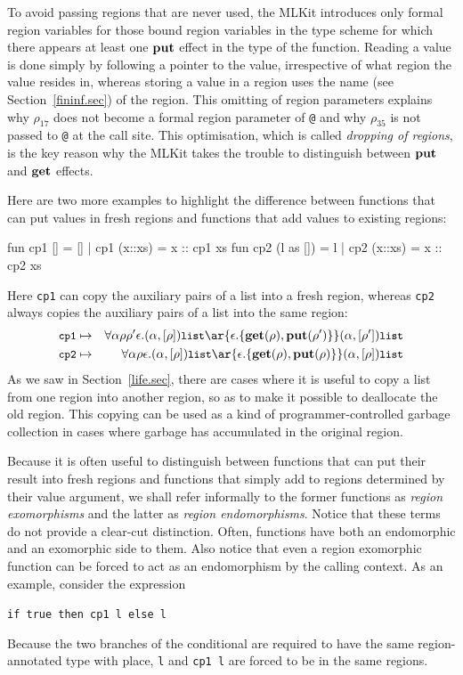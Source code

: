 \documentclass[12pt]{book}
\begin{document}
To avoid passing regions that are never used, the MLKit introduces only formal
region variables for those bound region variables in the type scheme for which
there appears at least one
%
%
$\mathop{\bf put}\nolimits$ effect in the type of the function.  Reading a value is done simply by
following a pointer to the value, irrespective of what region the value resides
in, whereas storing a value in a region uses the name (see
Section~\ref{fininf.sec}) of the region.  This omitting of region parameters
explains why $\rho_{17}$ does not become a formal region parameter of
\lstinline{@} and why $\rho_{35}$ is not passed to \lstinline{@} at the call
site. This optimisation, which is called
%
%
{\em dropping of regions}, is the key reason why the MLKit takes the trouble to
distinguish between $\mathop{\bf put}\nolimits$ and
%
%
$\mathop{\bf get}\nolimits$ \label{bother-to-distinguish-get-n-put}effects.

Here are two more examples to highlight the difference between functions that
can put values in fresh regions and functions that add values to existing
regions:
\begin{smlcode}
  fun cp1 [] = []
    | cp1 (x::xs) = x :: cp1 xs
  fun cp2 (l as []) = l
    | cp2 (x::xs) = x :: cp2 xs
\end{smlcode}
Here \lstinline{cp1} can copy the auxiliary pairs of a list into a fresh
region, whereas \lstinline{cp2} always copies the auxiliary pairs of a
list into the same region:
\begin{eqnarray*}
\kw{cp1}&\mapsto&\forall\alpha\rho\rho'\epsilon.
     (\alpha,[\rho])\kw{list} \ar{\epsilon.\{\Get(\rho),
           \Put(\rho')\}} (\alpha,[\rho'])\kw{list}\\
\kw{cp2}&\mapsto&\forall\alpha\rho\epsilon.
     (\alpha,[\rho])\kw{list} \ar{\epsilon.\{\Get(\rho),
           \Put(\rho)\}} (\alpha,[\rho])\kw{list}
\end{eqnarray*}
As we saw in Section~\ref{life.sec}, there are cases where it is useful to copy
a list from one region into another region, so as to make it possible to
deallocate the old region. This copying can be used as a kind of
programmer-controlled garbage collection in cases where garbage has accumulated
in the original region.

Because it is often useful to distinguish between functions that can put their
result into fresh regions and functions that simply add to regions determined by
their value argument, we shall refer informally to the former functions as
%
%
{\em region exomorphisms} and the latter as
%
%
{\em region endomorphisms}. Notice that these terms do not provide a clear-cut
distinction. Often, functions have both an endomorphic and an exomorphic side to
them. Also notice that even a region exomorphic function can be forced to act as
an endomorphism by the calling context. As an example, consider the expression
\begin{center}
  \lstinline!if true then cp1 l else l!
\end{center}
Because the two branches of the conditional are required to have the same
region-annotated type with place, \lstinline{l} and \lstinline{cp1 l} are forced
to be in the same regions.
\end{document}
